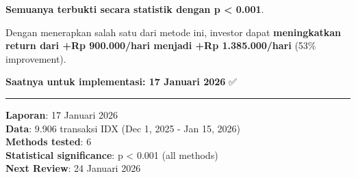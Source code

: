 \documentclass[
  10pt,
  a4paper,
]{article}
\begin{document}
\textbf{Semuanya terbukti secara statistik dengan p \textless{} 0.001}.

Dengan menerapkan salah satu dari metode ini, investor dapat
\textbf{meningkatkan return dari +Rp 900.000/hari menjadi +Rp
1.385.000/hari} (53\% improvement).

\textbf{Saatnya untuk implementasi: 17 Januari 2026} ✅

\begin{center}\rule{0.5\linewidth}{0.5pt}\end{center}

\textbf{Laporan}: 17 Januari 2026\\
\textbf{Data}: 9.906 transaksi IDX (Dec 1, 2025 - Jan 15, 2026)\\
\textbf{Methods tested}: 6\\
\textbf{Statistical significance}: p \textless{} 0.001 (all methods)\\
\textbf{Next Review}: 24 Januari 2026
\end{document}
